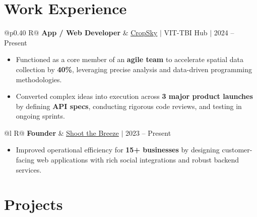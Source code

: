 \documentclass[a4paper,10pt]{article}
\newcommand{\ulink}[2]{\href{#1}{\uline{#2}}}
\newcommand{\subheading}[1]{{\color[HTML]{0A0A0A}\fontsize{12}{14}\selectfont\bfseries #1}}
\newcommand{\meta}[1]{{\color[HTML]{5C5C5C}\fontsize{10.5}{12.5}\selectfont #1}}
\begin{document}
\vspace{1pt}

\section{Work Experience}
\vspace{1pt}

\begin{tabularx}{\linewidth}{@{}p{0.40\linewidth} R@{}}
\subheading{App / Web Developer} & \meta{\ulink{https://sites.google.com/view/cropsky/home}{CropSky} $|$ VIT-TBI Hub $|$ 2024 -- Present}
\end{tabularx}
\begin{itemize}[nosep, leftmargin=1.5em, itemsep=1pt, topsep=2pt]
  \item {\color[HTML]{0A0A0A}\fontsize{11}{14}\selectfont Functioned as a core member of an \textbf{agile team} to accelerate spatial data collection by \textbf{40\%}, leveraging precise analysis and data-driven programming methodologies.}
  \item {\color[HTML]{0A0A0A}\fontsize{11}{14}\selectfont Converted complex ideas into execution across \textbf{3 major product launches} by defining \textbf{API specs}, conducting rigorous code reviews, and testing in ongoing sprints.}
\end{itemize}

\vspace{1pt}

\begin{tabularx}{\linewidth}{@{}l R@{}}
\subheading{Founder} & \meta{\ulink{https://shoot-the-breeze.vercel.app}{Shoot the Breeze} $|$ 2023 -- Present}
\end{tabularx}
\begin{itemize}[nosep, leftmargin=1.5em, itemsep=1pt, topsep=2pt]
  \item {\color[HTML]{0A0A0A}\fontsize{11}{14}\selectfont Improved operational efficiency for \textbf{15+ businesses} by designing customer-facing web applications with rich social integrations and robust backend services.}
\end{itemize}

\vspace{1pt}

\section{Projects}
\vspace{1pt}
\end{document}
